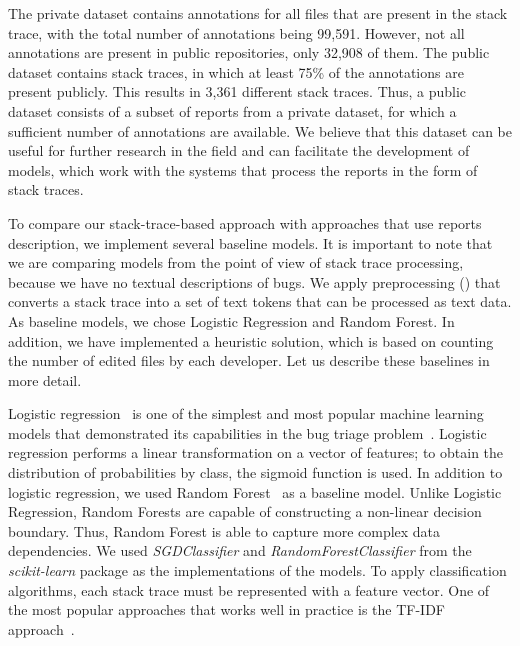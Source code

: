 The private dataset contains annotations for all files that are present in the stack trace, with the total number of annotations being 99,591. However, not all annotations are present in public repositories, only 32,908 of them. The public dataset contains stack traces, in which at least 75\% of the annotations are present publicly. This results in 3,361 different stack traces. Thus, a public dataset consists of a subset of reports from a private dataset, for which a sufficient number of annotations are available. We believe that this dataset can be useful for further research in the field and can facilitate the development of models, which work with the systems that process the reports in the form of stack traces.


To compare our stack-trace-based approach with approaches that use reports description, we implement several baseline models. It is important to note that we are comparing models from the point of view of stack trace processing, because we have no textual descriptions of bugs. We apply preprocessing () that converts a stack trace into a set of text tokens that can be processed as text data. As baseline models, we chose Logistic Regression and Random Forest. In addition, we have implemented a heuristic solution, which is based on counting the number of edited files by each developer. Let us describe these baselines in more detail.

Logistic regression~\cite{Hosmer1989AppliedLR} is one of the simplest and most popular machine learning models that demonstrated its capabilities in the bug triage problem~\cite{sarkar2019improving}. Logistic regression performs a linear transformation on a vector of features; to obtain the distribution of probabilities by class, the sigmoid function is used. 
In addition to logistic regression, we used Random Forest~\cite{Breiman2004RandomF} as a baseline model. Unlike Logistic Regression, Random Forests are capable of constructing a non-linear decision boundary. Thus, Random Forest is able to capture more complex data dependencies. 
We used \textit{SGDClassifier} and \textit{
RandomForestClassifier} from the \textit{scikit-learn} package as the implementations of the models.
To apply classification algorithms, each stack trace must be represented with a feature vector. One of the most popular approaches that works well in practice is the TF-IDF approach~\cite{Ramos2003UsingTT}. 

